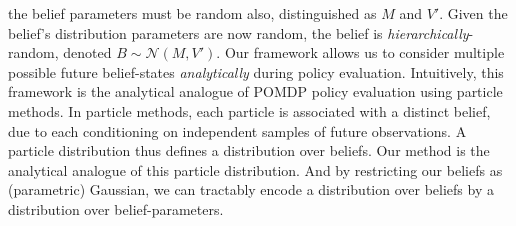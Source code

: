 \documentclass{article}
\newcommand{\N}{\mathcal{N}}
\begin{document}
the belief parameters must be random also, distinguished as $M$ and $V'$.
Given the belief's distribution parameters are now random,
the belief is \textit{hierarchically}-random, denoted $B\sim\N(M,V')$. %
Our framework allows us to consider multiple possible future belief-states \textit{analytically}
during policy evaluation.
Intuitively, this framework is the analytical analogue of
POMDP policy evaluation using particle methods.
In particle methods, each particle is associated
with a distinct belief, due to each conditioning on independent samples of future observations.
A particle distribution thus defines a distribution over beliefs.
Our method is the analytical analogue of this particle distribution.
And by restricting our beliefs as (parametric) Gaussian,
we can tractably encode a distribution over beliefs by a distribution over belief-parameters.
\end{document}
